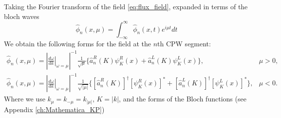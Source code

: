

Taking the Fourier transform of the field \ref{eq:flux_field}, expanded in terms of the bloch waves
\begin{equation}\label{eq:field_FT}
    \hat{\phi}_n(x, \mu) = \int_{-\infty}^\infty \hat{\phi}_n(x,t) e^{i\mu t} dt
\end{equation}
%
We obtain the following forms for the field at the $n$th CPW segment:
\begin{subequations} \label{eq:phi_FT}
\begin{eqnarray}
    \hat{\phi}_n(x, \mu) =  \left|\left.\frac{d\omega}{dk}\right|_{\omega=\mu}\right|^{-1}\frac{1}{\sqrt{\mu}}\biggl\lbrace \hat{a}_n^R(K) \psi^R_K(x) + \hat{a}_n^L(K)\psi_K^L(x)\biggr\rbrace, & \mu > 0, \label{eq:phi_FT_a}\\
    \hat{\phi}_n(x, \mu) = \left|\left.\frac{d\omega}{dk}\right|_{\omega=\mu}\right|^{-1}\frac{1}{\sqrt{|\mu|}}\biggl\lbrace [\hat{a}^R_n(K)]^\dagger \left[\psi^R_K(x)\right]^* + [\hat{a}_n^L(K)]^\dagger\left[\psi_K^L(x)\right]^*\biggr\rbrace, & \mu < 0. \label{eq:phi_FT_b}
\end{eqnarray}
\end{subequations}
%
Where we use $k_{\mu} = k_{-\mu} = k_{|\mu|}$, $K = |k|$, and the forms of the Bloch functions (see Appendix \ref{ch:Mathematica_KP})

\color{black}

